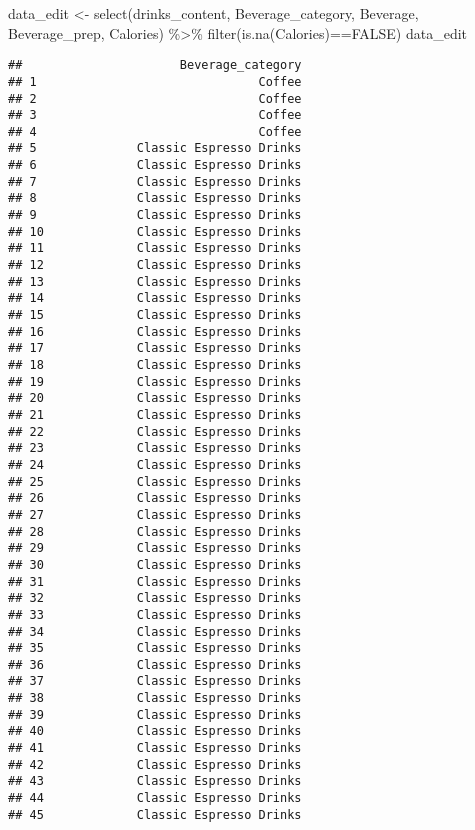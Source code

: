 \documentclass[
]{article}
\newenvironment{Shaded}{\begin{snugshade}}{\end{snugshade}}
\newcommand{\ConstantTok}[1]{\textcolor[rgb]{0.00,0.00,0.00}{#1}}
\newcommand{\FunctionTok}[1]{\textcolor[rgb]{0.00,0.00,0.00}{#1}}
\newcommand{\NormalTok}[1]{#1}
\newcommand{\OtherTok}[1]{\textcolor[rgb]{0.56,0.35,0.01}{#1}}
\newcommand{\SpecialCharTok}[1]{\textcolor[rgb]{0.00,0.00,0.00}{#1}}
\begin{document}
\begin{Shaded}
\begin{Highlighting}[]
\NormalTok{data\_edit }\OtherTok{\textless{}{-}} \FunctionTok{select}\NormalTok{(drinks\_content, Beverage\_category, Beverage, Beverage\_prep, Calories)  }\SpecialCharTok{\%\textgreater{}\%}
  \FunctionTok{filter}\NormalTok{(}\FunctionTok{is.na}\NormalTok{(Calories)}\SpecialCharTok{==}\ConstantTok{FALSE}\NormalTok{)}
\NormalTok{data\_edit}
\end{Highlighting}
\end{Shaded}

\begin{verbatim}
##                      Beverage_category
## 1                               Coffee
## 2                               Coffee
## 3                               Coffee
## 4                               Coffee
## 5              Classic Espresso Drinks
## 6              Classic Espresso Drinks
## 7              Classic Espresso Drinks
## 8              Classic Espresso Drinks
## 9              Classic Espresso Drinks
## 10             Classic Espresso Drinks
## 11             Classic Espresso Drinks
## 12             Classic Espresso Drinks
## 13             Classic Espresso Drinks
## 14             Classic Espresso Drinks
## 15             Classic Espresso Drinks
## 16             Classic Espresso Drinks
## 17             Classic Espresso Drinks
## 18             Classic Espresso Drinks
## 19             Classic Espresso Drinks
## 20             Classic Espresso Drinks
## 21             Classic Espresso Drinks
## 22             Classic Espresso Drinks
## 23             Classic Espresso Drinks
## 24             Classic Espresso Drinks
## 25             Classic Espresso Drinks
## 26             Classic Espresso Drinks
## 27             Classic Espresso Drinks
## 28             Classic Espresso Drinks
## 29             Classic Espresso Drinks
## 30             Classic Espresso Drinks
## 31             Classic Espresso Drinks
## 32             Classic Espresso Drinks
## 33             Classic Espresso Drinks
## 34             Classic Espresso Drinks
## 35             Classic Espresso Drinks
## 36             Classic Espresso Drinks
## 37             Classic Espresso Drinks
## 38             Classic Espresso Drinks
## 39             Classic Espresso Drinks
## 40             Classic Espresso Drinks
## 41             Classic Espresso Drinks
## 42             Classic Espresso Drinks
## 43             Classic Espresso Drinks
## 44             Classic Espresso Drinks
## 45             Classic Espresso Drinks

\end{verbatim}
\end{document}
